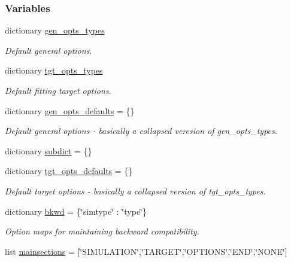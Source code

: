 \subsubsection*{Variables}
\begin{DoxyCompactItemize}
\item 
dictionary \hyperlink{namespaceforcebalance_1_1parser_a1ccdff008f4be5f63c068d2a592d69ab}{gen\-\_\-opts\-\_\-types}
\begin{DoxyCompactList}\small\item\em Default general options. \end{DoxyCompactList}\item 
dictionary \hyperlink{namespaceforcebalance_1_1parser_a95436b7fb9e99bd7b9f0a040b15fbe3a}{tgt\-\_\-opts\-\_\-types}
\begin{DoxyCompactList}\small\item\em Default fitting target options. \end{DoxyCompactList}\item 
dictionary \hyperlink{namespaceforcebalance_1_1parser_a980fd024b1f2877247de482247250b9e}{gen\-\_\-opts\-\_\-defaults} = \{\}
\begin{DoxyCompactList}\small\item\em Default general options -\/ basically a collapsed veresion of gen\-\_\-opts\-\_\-types. \end{DoxyCompactList}\item 
dictionary \hyperlink{namespaceforcebalance_1_1parser_abb7a7e9723de629aa97727a85bcdbad1}{subdict} = \{\}
\item 
dictionary \hyperlink{namespaceforcebalance_1_1parser_aff4922444f06b7334a0994a835607393}{tgt\-\_\-opts\-\_\-defaults} = \{\}
\begin{DoxyCompactList}\small\item\em Default target options -\/ basically a collapsed version of tgt\-\_\-opts\-\_\-types. \end{DoxyCompactList}\item 
dictionary \hyperlink{namespaceforcebalance_1_1parser_a121eaaef101563523a8fb20bd5ace409}{bkwd} = \{\char`\"{}simtype\char`\"{} \-: \char`\"{}type\char`\"{}\}
\begin{DoxyCompactList}\small\item\em Option maps for maintaining backward compatibility. \end{DoxyCompactList}\item 
list \hyperlink{namespaceforcebalance_1_1parser_a682a3870774181592a7a4784ab108ae6}{mainsections} = \mbox{[}\char`\"{}S\-I\-M\-U\-L\-A\-T\-I\-O\-N\char`\"{},\char`\"{}T\-A\-R\-G\-E\-T\char`\"{},\char`\"{}O\-P\-T\-I\-O\-N\-S\char`\"{},\char`\"{}E\-N\-D\char`\"{},\char`\"{}N\-O\-N\-E\char`\"{}\mbox{]}

\end{DoxyCompactItemize}
